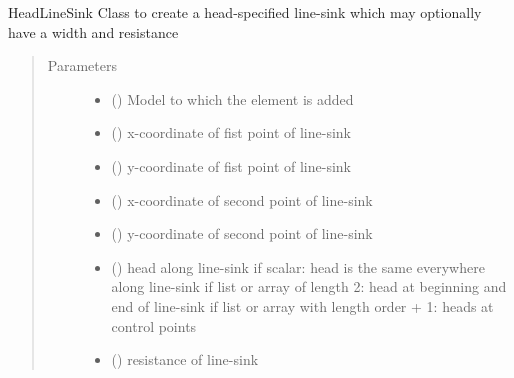 \documentclass[letterpaper,10pt,english]{sphinxmanual}
\begin{document}
\begin{fulllineitems}
\label{\detokenize{linesinks/headlinesink:timml.linesink.HeadLineSink}}
HeadLineSink Class to create a head-specified line-sink
which may optionally have a width and resistance
\begin{quote}\begin{description}
\item[{Parameters}] \leavevmode\begin{itemize}
\item {} 
 () \textendash{} Model to which the element is added

\item {} 
 () \textendash{} x-coordinate of fist point of line-sink

\item {} 
 () \textendash{} y-coordinate of fist point of line-sink

\item {} 
 () \textendash{} x-coordinate of second point of line-sink

\item {} 
 () \textendash{} y-coordinate of second point of line-sink

\item {} 
 (\sphinxstyleliteralemphasis{, }) \textendash{} head along line-sink
if scalar: head is the same everywhere along line-sink
if list or array of length 2: head at beginning and end of line-sink
if list or array with length order + 1: heads at control points

\item {} 
 (\sphinxstyleliteralemphasis{ (}\sphinxstyleliteralemphasis{)}) \textendash{} resistance of line-sink


\end{itemize}
\end{description}
\end{quote}
\end{fulllineitems}
\end{document}
